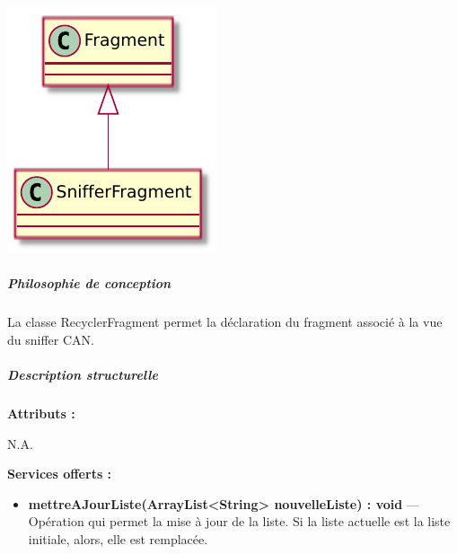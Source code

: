 \begin{minipage}
    {\linewidth}
    \centering
    \includegraphics[width=0.30\linewidth]{../schemas/Conception_detaillee/classe_snifferFragment.pdf}
\end{minipage}

\subparagraph{Philosophie de conception \newline} 

\medspace

La classe RecyclerFragment permet la déclaration du fragment associé à la vue du sniffer CAN.  

\subparagraph{Description structurelle \newline}

\medspace

\textbf{Attributs :}

N.A.

\textbf{Services offerts :}

\begin{itemize}
    \item \textbf{mettreAJourListe(ArrayList<String> nouvelleListe) : void } --- Opération qui permet la mise à jour de la liste. Si la liste actuelle est la liste initiale, alors, elle est remplacée.  
\end{itemize}